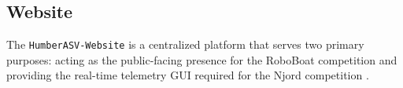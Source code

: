 %
%
%
%


\subsection{Website}
\label{sec:website}
The \texttt{HumberASV-Website} is a centralized platform that serves two primary purposes: acting as the public-facing presence for the RoboBoat competition \autocite{ROBOBOAT} and providing the real-time telemetry GUI required for the Njord competition \autocite{NJORDGUI}.

